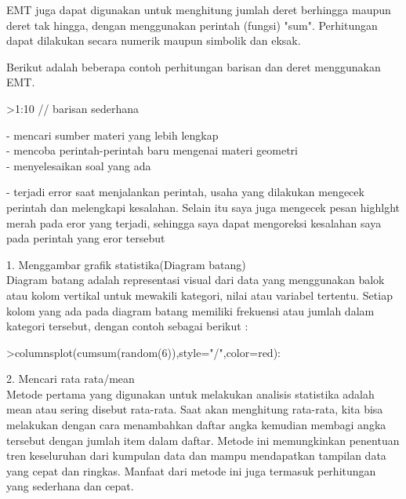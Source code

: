 \documentclass[a4paper,10pt]{article}
\begin{document}
\begin{eulernotebook}
\begin{eulercomment}
\begin{eulercomment}
\begin{eulercomment}
EMT juga dapat digunakan untuk menghitung jumlah deret berhingga
maupun deret tak hingga, dengan menggunakan perintah (fungsi) "sum".
Perhitungan dapat dilakukan secara numerik maupun simbolik dan eksak.

Berikut adalah beberapa contoh perhitungan barisan dan deret
menggunakan EMT.
\end{eulercomment}
\begin{eulerprompt}
>1:10 // barisan sederhana
\end{eulerprompt}
\begin{euleroutput}
  [1,  2,  3,  4,  5,  6,  7,  8,  9,  10]
\end{euleroutput}
\begin{eulercomment}
- mencari sumber materi yang lebih lengkap\\
- mencoba perintah-perintah baru mengenai materi geometri\\
- menyelesaikan soal yang ada

\end{eulercomment}
\begin{eulercomment}
- terjadi error saat menjalankan perintah, usaha yang dilakukan mengecek perintah dan
melengkapi kesalahan. Selain itu saya juga mengecek pesan highlght merah pada eror yang
terjadi, sehingga saya dapat mengoreksi kesalahan saya pada perintah yang eror tersebut
\end{eulercomment}
\begin{eulercomment}

\end{eulercomment}
\eulersubheading{}
\eulersubheading{}
\begin{eulercomment}
1. Menggambar grafik statistika(Diagram batang)\\
Diagram batang adalah representasi visual dari data yang menggunakan balok atau kolom
vertikal untuk mewakili kategori, nilai atau variabel tertentu. Setiap kolom yang ada pada
diagram  batang memiliki frekuensi atau jumlah dalam kategori tersebut, dengan contoh sebagai
berikut :
\end{eulercomment}
\begin{eulerprompt}
>columnsplot(cumsum(random(6)),style="/",color=red):
\end{eulerprompt}
\begin{eulercomment}
2. Mencari rata rata/mean\\
Metode pertama yang digunakan untuk melakukan analisis statistika
adalah mean atau sering disebut rata-rata. Saat akan menghitung
rata-rata, kita bisa melakukan dengan cara menambahkan daftar angka
kemudian membagi angka tersebut dengan jumlah item dalam daftar.
Metode ini memungkinkan penentuan tren keseluruhan dari kumpulan data
dan mampu mendapatkan tampilan data yang cepat dan ringkas. Manfaat
dari metode ini juga termasuk perhitungan yang sederhana dan cepat.


\end{eulercomment}
\end{eulercomment}
\end{eulercomment}
\end{eulernotebook}
\end{document}
